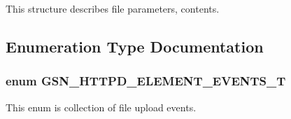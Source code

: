 This structure describes file parameters, contents. 



\subsection{Enumeration Type Documentation}
\hypertarget{a00511_a08d46f405dab1ea7ad33b522e3604839}{
\subsubsection[{GSN\_\-HTTPD\_\-ELEMENT\_\-EVENTS\_\-T}]{\setlength{\rightskip}{0pt plus 5cm}enum {\bf GSN\_\-HTTPD\_\-ELEMENT\_\-EVENTS\_\-T}}}
\label{a00511_a08d46f405dab1ea7ad33b522e3604839}


This enum is collection of file upload events. 

